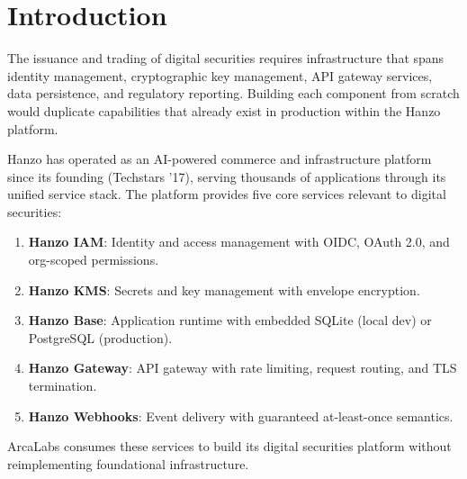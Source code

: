 \section{Introduction}

\label{sec:intro}

The issuance and trading of digital securities requires infrastructure
that spans identity management, cryptographic key management, API
gateway services, data persistence, and regulatory reporting. Building
each component from scratch would duplicate capabilities that already
exist in production within the Hanzo platform.

Hanzo has operated as an AI-powered commerce and infrastructure platform
since its founding (Techstars '17), serving thousands of applications
through its unified service stack. The platform provides five core
services relevant to digital securities:

\begin{enumerate}[leftmargin=1.4em]
    \item \textbf{Hanzo IAM}: Identity and access management with OIDC,
    OAuth 2.0, and org-scoped permissions.
    \item \textbf{Hanzo KMS}: Secrets and key management with
    envelope encryption.
    \item \textbf{Hanzo Base}: Application runtime with embedded
    SQLite (local dev) or PostgreSQL (production).
    \item \textbf{Hanzo Gateway}: API gateway with rate limiting,
    request routing, and TLS termination.
    \item \textbf{Hanzo Webhooks}: Event delivery with guaranteed
    at-least-once semantics.
\end{enumerate}

ArcaLabs consumes these services to build its digital securities
platform without reimplementing foundational infrastructure.

